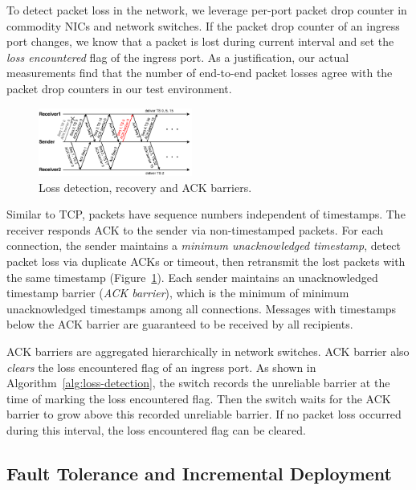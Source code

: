 To detect packet loss in the network, we leverage per-port packet drop counter in commodity NICs and network switches.
If the packet drop counter of an ingress port changes, we know that a packet is lost during current interval and set the \textit{loss encountered} flag of the ingress port.
As a justification, our actual measurements find that the number of end-to-end packet losses agree with the packet drop counters in our test environment.


\begin{figure}[t]
\centering
\includegraphics[width=0.45\textwidth]{images/loss_detection.pdf}
\caption{Loss detection, recovery and ACK barriers.}
\label{fig:ack-barrier}
\vspace{-0.4em}
\end{figure}



Similar to TCP, packets have sequence numbers independent of timestamps.
The receiver responds ACK to the sender via non-timestamped packets.
For each connection, the sender maintains a \textit{minimum unacknowledged timestamp}, detect packet loss via duplicate ACKs or timeout, then retransmit the lost packets with the same timestamp (Figure~\ref{fig:ack-barrier}).
Each sender maintains an unacknowledged timestamp barrier (\textit{ACK barrier}), which is the minimum of minimum unacknowledged timestamps among all connections. Messages with timestamps below the ACK barrier are guaranteed to be received by all recipients.

ACK barriers are aggregated hierarchically in network switches.
ACK barrier also \textit{clears} the loss encountered flag of an ingress port.
As shown in Algorithm~\ref{alg:loss-detection}, the switch records the unreliable barrier at the time of marking the loss encountered flag. Then the switch waits for the ACK barrier to grow above this recorded unreliable barrier. If no packet loss occurred during this interval, the loss encountered flag can be cleared.


\subsection{Fault Tolerance and Incremental Deployment}
\label{sec:incremental}

